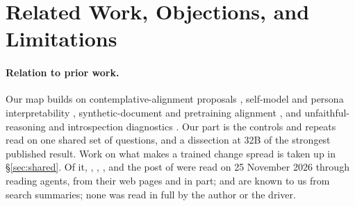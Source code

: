 \documentclass[11pt]{article}
\begin{document}
\section{Related Work, Objections, and Limitations}\label{sec:related}\label{sec:alternatives}

\paragraph{Relation to prior work.} Our map builds on contemplative-alignment proposals \citep{laukkonen2025contemplative,laukkonen2026positive,doctor2022care,shanahan2012satori,milanw2025noself,mao2026existential}, self-model and persona interpretability \citep{chen2025persona,lu2026assistant,lindsey2026introspection,douglas2026artificial}, synthetic-document and pretraining alignment \citep{li2026msm,tice2026pretraining,wichers2025inoculation}, and unfaithful-reasoning and introspection diagnostics \citep{turpin2023unfaithful,berg2025selfreferential}. Our part is the controls and repeats read on one shared set of questions, and a dissection at 32B of the strongest published result. Work on what makes a trained change spread is taken up in \S\ref{sec:shared}. Of it, \citet{soligo2026easy}, \citet{zhao2026persona}, \citet{li2025spilling}, \citet{li2026notmagical} and the post of \citet{jagadeesh2026beneficial} were read on 25 November 2026 through reading agents, from their web pages and in part; \citet{betley2025weird} and \citet{taylor2025school} are known to us from search summaries; none was read in full by the author or the driver.
\end{document}

